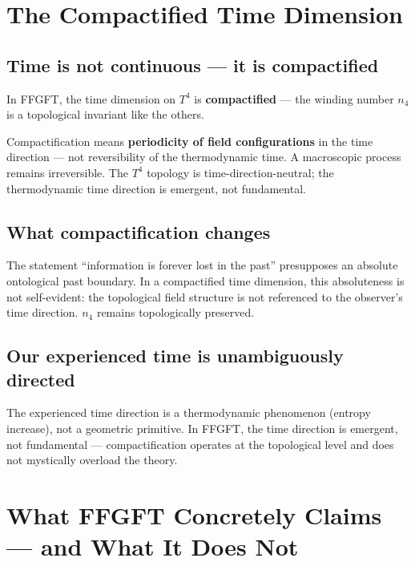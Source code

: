 \section{The Compactified Time Dimension}

\subsection{Time is not continuous --- it is compactified}

In FFGFT, the time dimension on $T^4$ is \textbf{compactified} --- the winding number $n_4$ is a topological invariant like the others.

\begin{wichtig}
Compactification means \textbf{periodicity of field configurations} in the time direction --- not reversibility of the thermodynamic time. A macroscopic process remains irreversible. The $T^4$ topology is time-direction-neutral; the thermodynamic time direction is emergent, not fundamental.
\end{wichtig}

\subsection{What compactification changes}

The statement ``information is forever lost in the past'' presupposes an absolute ontological past boundary. In a compactified time dimension, this absoluteness is not self-evident: the topological field structure is not referenced to the observer's time direction. $n_4$ remains topologically preserved.

\subsection{Our experienced time is unambiguously directed}

The experienced time direction is a thermodynamic phenomenon (entropy increase), not a geometric primitive. In FFGFT, the time direction is emergent, not fundamental --- compactification operates at the topological level and does not mystically overload the theory.

\section{What FFGFT Concretely Claims --- and What It Does Not}

